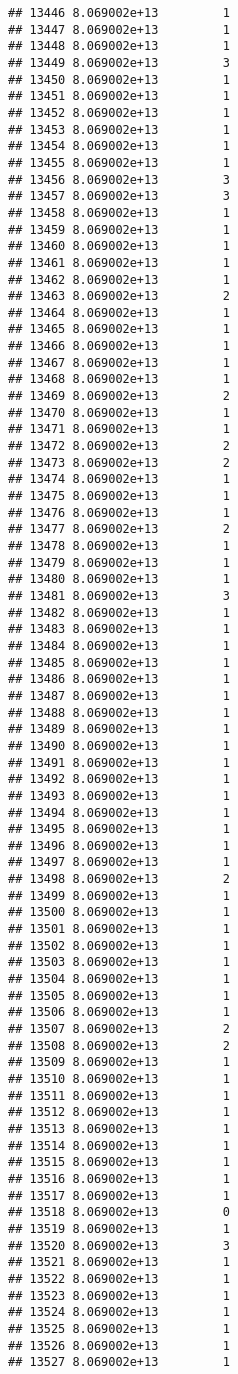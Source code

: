 \documentclass[
]{article}
\begin{document}
\begin{verbatim}
## 13446 8.069002e+13         1
## 13447 8.069002e+13         1
## 13448 8.069002e+13         1
## 13449 8.069002e+13         3
## 13450 8.069002e+13         1
## 13451 8.069002e+13         1
## 13452 8.069002e+13         1
## 13453 8.069002e+13         1
## 13454 8.069002e+13         1
## 13455 8.069002e+13         1
## 13456 8.069002e+13         3
## 13457 8.069002e+13         3
## 13458 8.069002e+13         1
## 13459 8.069002e+13         1
## 13460 8.069002e+13         1
## 13461 8.069002e+13         1
## 13462 8.069002e+13         1
## 13463 8.069002e+13         2
## 13464 8.069002e+13         1
## 13465 8.069002e+13         1
## 13466 8.069002e+13         1
## 13467 8.069002e+13         1
## 13468 8.069002e+13         1
## 13469 8.069002e+13         2
## 13470 8.069002e+13         1
## 13471 8.069002e+13         1
## 13472 8.069002e+13         2
## 13473 8.069002e+13         2
## 13474 8.069002e+13         1
## 13475 8.069002e+13         1
## 13476 8.069002e+13         1
## 13477 8.069002e+13         2
## 13478 8.069002e+13         1
## 13479 8.069002e+13         1
## 13480 8.069002e+13         1
## 13481 8.069002e+13         3
## 13482 8.069002e+13         1
## 13483 8.069002e+13         1
## 13484 8.069002e+13         1
## 13485 8.069002e+13         1
## 13486 8.069002e+13         1
## 13487 8.069002e+13         1
## 13488 8.069002e+13         1
## 13489 8.069002e+13         1
## 13490 8.069002e+13         1
## 13491 8.069002e+13         1
## 13492 8.069002e+13         1
## 13493 8.069002e+13         1
## 13494 8.069002e+13         1
## 13495 8.069002e+13         1
## 13496 8.069002e+13         1
## 13497 8.069002e+13         1
## 13498 8.069002e+13         2
## 13499 8.069002e+13         1
## 13500 8.069002e+13         1
## 13501 8.069002e+13         1
## 13502 8.069002e+13         1
## 13503 8.069002e+13         1
## 13504 8.069002e+13         1
## 13505 8.069002e+13         1
## 13506 8.069002e+13         1
## 13507 8.069002e+13         2
## 13508 8.069002e+13         2
## 13509 8.069002e+13         1
## 13510 8.069002e+13         1
## 13511 8.069002e+13         1
## 13512 8.069002e+13         1
## 13513 8.069002e+13         1
## 13514 8.069002e+13         1
## 13515 8.069002e+13         1
## 13516 8.069002e+13         1
## 13517 8.069002e+13         1
## 13518 8.069002e+13         0
## 13519 8.069002e+13         1
## 13520 8.069002e+13         3
## 13521 8.069002e+13         1
## 13522 8.069002e+13         1
## 13523 8.069002e+13         1
## 13524 8.069002e+13         1
## 13525 8.069002e+13         1
## 13526 8.069002e+13         1
## 13527 8.069002e+13         1

\end{verbatim}
\end{document}
